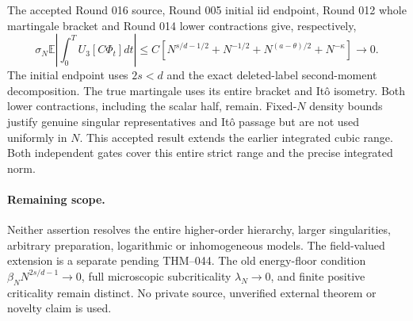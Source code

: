 \documentclass[10pt]{article}
\newcommand{\E}{\mathbb E}
\begin{document}
The accepted Round 016 source, Round 005 initial iid endpoint, Round 012 whole martingale bracket and Round 014 lower contractions give, respectively,
\[
 \sigma_N\E\left|\int_0^TU_3[C\Phi_t]dt\right|
 \le C\left[N^{s/d-1/2}+N^{-1/2}
            +N^{(a-\theta)/2}+N^{-\kappa}\right]\longrightarrow0.
\]
The initial endpoint uses $2s<d$ and the exact deleted-label second-moment decomposition. The true martingale uses its entire bracket and It\^o isometry. Both lower contractions, including the scalar half, remain. Fixed-$N$ density bounds justify genuine singular representatives and It\^o passage but are not used uniformly in $N$. This accepted result extends the earlier integrated cubic range. Both independent gates cover this entire strict range and the precise integrated norm.

\paragraph{Remaining scope.}
Neither assertion resolves the entire higher-order hierarchy, larger singularities, arbitrary preparation, logarithmic or inhomogeneous models. The field-valued extension is a separate pending THM--044. The old energy-floor condition $\beta_NN^{2s/d-1}\to0$, full microscopic subcriticality $\lambda_N\to0$, and finite positive criticality remain distinct. No private source, unverified external theorem or novelty claim is used.
\end{document}
